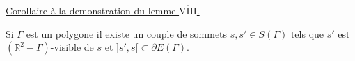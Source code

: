 \uline{Corollaire à la demonstration du lemme $\underline{\overline{\mathrm{VIII}}}$.} \margin{!!}

Si $\Gamma$ est un polygone il existe un couple de sommets  $s,s'\in S(\Gamma)$ tels que $s'$ est  $(\mathbb{R}^2-\Gamma)$-visible de $s$ et $]s',s[\subset\partial E(\Gamma)$.
